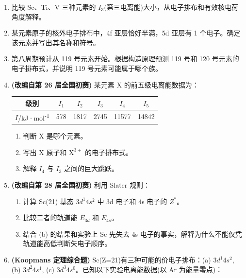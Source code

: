 \begin{enumerate}
\def\labelenumi{\arabic{enumi}.}
\setcounter{enumi}{19}
\item
  比较 Sc、Ti、V 三种元素的 \(I_3\)(第三电离能)大小，从电子排布和有效核电荷角度解释。
\item
  某元素原子的核外电子排布中，4f 亚层恰好半满，5d 亚层有 1 个电子。确定该元素并写出其名称和符号。
\item
  第八周期预计从 119 号元素开始。根据构造原理预测 119 号和 120 号元素的电子排布式，并说明 119 号元素可能属于哪个族。
\item
  \textbf{(改编自第 26 届全国初赛)} 某元素 X 的前五级电离能数据为：

  {\def\LTcaptype{none} %
  \begin{longtable}[]{@{}cccccc@{}}
  \toprule\noalign{}
  级别 & \(I_1\) & \(I_2\) & \(I_3\) & \(I_4\) & \(I_5\) \\
  \midrule\noalign{}
  \endhead
  \bottomrule\noalign{}
  \endlastfoot
  \(I\)/kJ·mol\textsuperscript{-1} & 578 & 1817 & 2745 & 11577 & 14842 \\
  \end{longtable}
  }

  \begin{enumerate}
  \def\labelenumii{(\alph{enumii})}
  \tightlist
  \item
    判断 X 是哪个元素。
  \item
    写出 X 原子和 \(\mathrm{X^{3+}}\) 的电子排布式。
  \item
    解释 \(I_4\) 与 \(I_3\) 之间的巨大跳跃。
  \end{enumerate}
\item
  \textbf{(改编自第 28 届全国初赛)} 利用 Slater 规则：

  \begin{enumerate}
  \def\labelenumii{(\alph{enumii})}
  \tightlist
  \item
    计算 Sc(21) 基态 \(3d^1 4s^2\) 中 3d 电子和 4s 电子的 \(Z^*\)。
  \item
    比较二者的轨道能 \(E_{3d}\) 和 \(E_{4s}\)。
  \item
    结合 (b) 的结果和实验上 Sc 先失去 4s 电子的事实，解释为什么不能仅凭轨道能高低判断失电子顺序。
  \end{enumerate}
\item
  \textbf{(Koopmans 定理综合题)} Sc(Z=21)有三种可能的价电子排布：(a) \(3d^1 4s^2\), (b) \(3d^2 4s^1\), (c) \(3d^3 4s^0\)。已知以下实验电离能数据(以 Ar 为能量零点)：


\end{enumerate}
